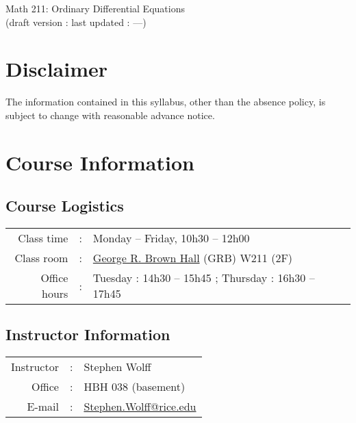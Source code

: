 


\begin{center}
{\Large Math 211: Ordinary Differential Equations}\\
{\scriptsize (draft version : last updated : \Year--\Month--\Day)}
\end{center}





\section{Disclaimer}

The information contained in this syllabus, other than the absence policy, is subject to change with reasonable advance notice.



%
%
%
%

\section{Course Information}



\subsection{Course Logistics}

\begin{tabular}{r c l}
Class time 	&	:	&	Monday -- Friday, 10h30 -- 12h00	\\
Class room	&	:	&	\href{https://goo.gl/maps/CfwNovWqwqMdsBUV6}{George R. Brown Hall} (GRB) W211 (2F)	\\
Office hours	&	:	&	Tuesday : 14h30 -- 15h45 ; Thursday : 16h30 -- 17h45
\end{tabular}



\subsection{Instructor Information}


\begin{tabular}{r c l}
Instructor	&	:	&	Stephen Wolff	\\
Office 	&	:	&	HBH 038 (basement)	\\
E-mail	&	:	&	\href{mailto:Stephen.Wolff@rice.edu?subject=[Math\%20211]}{Stephen.Wolff@rice.edu}
\end{tabular}



